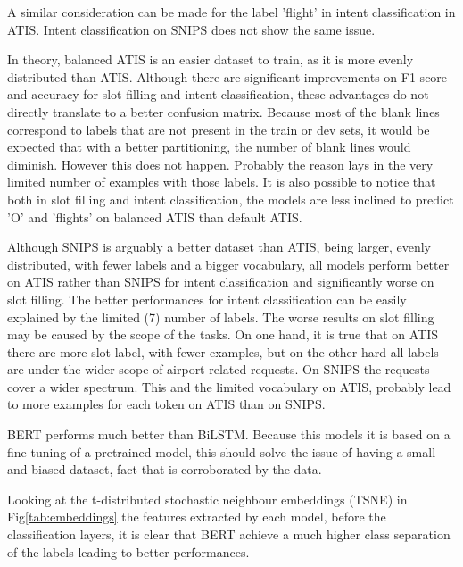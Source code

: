 \documentclass[a4paper]{article}
\begin{document}
A similar consideration can be made for the label 'flight' in intent classification in ATIS. Intent classification on SNIPS does not show the same issue. 

In theory, balanced ATIS is an easier dataset to train, as it is more evenly distributed than ATIS. Although there are significant improvements on F1 score and accuracy for slot filling and intent classification, these advantages do not directly translate to a better confusion matrix. Because most of the blank lines correspond to labels that are not present in the train or dev sets, it would be expected that with a better partitioning, the number of blank lines would diminish. However this does not happen. Probably the reason lays in the very limited number of examples with those labels. 
It is also possible to notice that both in slot filling and intent classification, the models are less inclined to predict 'O' and 'flights' on balanced ATIS than default ATIS.

Although SNIPS is arguably a better dataset than ATIS, being larger, evenly distributed, with fewer labels and a bigger vocabulary, all models perform better on ATIS rather than SNIPS for intent classification and significantly worse on slot filling. The better performances for intent classification can be easily explained by the limited (7) number of labels. The worse results on slot filling may be caused by the scope of the tasks. 
On one hand, it is true that on ATIS there are more slot label, with fewer examples, but on the other hard all labels are under the wider scope of airport related requests. On SNIPS the requests cover a wider spectrum. This and the limited vocabulary on ATIS, probably lead to more examples for each token on ATIS than on SNIPS.


BERT performs much better than BiLSTM. Because this models it is based on a fine tuning of a pretrained model, this should solve the issue of having a small and biased dataset, fact that is corroborated by the data. 

Looking at the t-distributed stochastic neighbour embeddings (TSNE) in Fig\ref{tab:embeddings} the features extracted by each model, before the classification layers, it is clear that BERT achieve a much higher class separation of the labels leading to better performances. 
\end{document}
